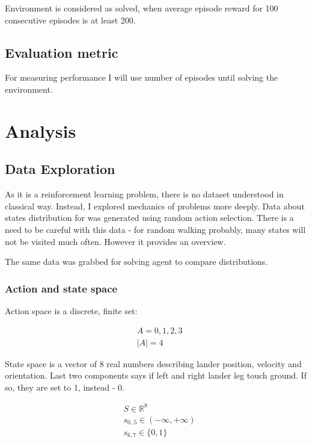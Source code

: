 \documentclass[12pt]{article}
\begin{document}
Environment is considered as solved, when average episode reward for 100 consecutive episodes is at least 200.

\subsection{Evaluation metric}

For measuring performance I will use number of episodes until solving the environment.

\section{Analysis}
\subsection{Data Exploration}

As it is a reinforcement learning problem, there is no dataset understood in classical way. Instead, I explored mechanics of problems more deeply. Data about states distribution for was generated using random action selection. There is a need to be careful with this data - for random walking probably, many states will not be visited much often. However it provides an overview.

The same data was grabbed for solving agent to compare distributions.

\subsubsection{Action and state space}

Action space is a discrete, finite set:

\begin{equation}
\begin{aligned}
&A = {0,1,2,3} \\
&|A| = 4
\end{aligned}
\end{equation}

State space is a vector of 8 real numbers describing lander position, velocity and orientation. Last two components says if left and right lander leg touch ground. If so, they are set to 1, instead - 0.

\begin{equation}
\begin{aligned}
&S \in \mathbb{R}^8 \\
&s_{0..5} \in (-\infty, +\infty) \\
&s_{6,7} \in \{0,1\} \\
\end{aligned}
\end{equation}
\end{document}
